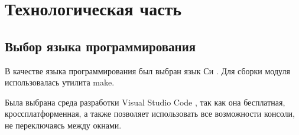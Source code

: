 \section{Технологическая часть}

\subsection{Выбор языка программирования}
В качестве языка программирования был выбран язык Си \cite{c}. Для сборки модуля использовалась утилита make.

Была выбрана среда разработки Visual Studio Code \cite{VStudio}, так как она бесплатная, кроссплатформенная,  а также позволяет использовать все возможности консоли, не переключаясь между окнами. \newline

